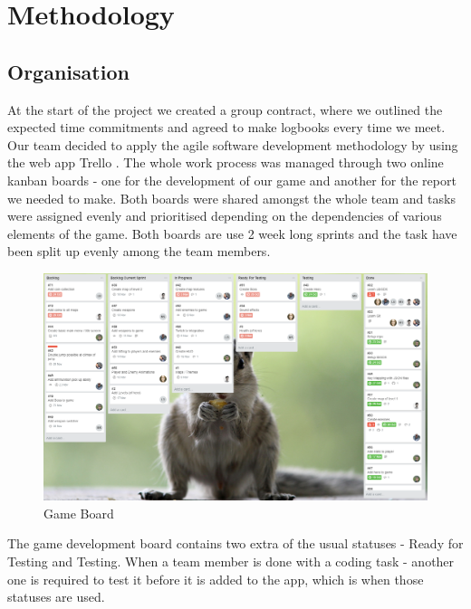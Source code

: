 \documentclass[12p]{article}
\begin{document}

\newpage
\section{Methodology} \label{Methodology}
\subsection{Organisation}
At the start of the project we created a group contract, where we outlined the expected time commitments and agreed to make logbooks every time we meet. Our team decided to apply the agile software development methodology by using the web app Trello \cite{Trello}. The whole work process was managed through two online kanban boards - one for the development of our game and another for the report we needed to make. Both boards were shared amongst the whole team and tasks were assigned evenly and prioritised depending on the dependencies of various elements of the game. Both boards are use 2 week long sprints and the task have been split up evenly among the team members.

\begin{figure}[ht]
  \center
  \includegraphics[width=1\textwidth]{Methodology/GameBoard.png}
  \caption{Game Board}
\end{figure}

The game development board contains two extra of the usual statuses - Ready for Testing and Testing. When a team member is done with a coding task - another one is required to test it before it is added to the app, which is when those statuses are used.
\end{document}
